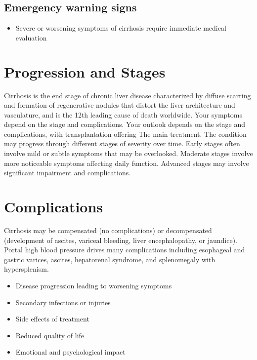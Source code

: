 \subsection{Emergency warning signs}
\begin{itemize}[noitemsep]
  \item Severe or worsening symptoms of cirrhosis require immediate medical evaluation
\end{itemize}
\section{Progression and Stages}
Cirrhosis is the end stage of chronic liver disease characterized by diffuse scarring and formation of regenerative nodules that distort the liver architecture and vasculature, and is the 12th leading cause of death worldwide. Your symptoms depend on the stage and complications. Your outlook depends on the stage and complications, with transplantation offering The main treatment. The condition may progress through different stages of severity over time. Early stages often involve mild or subtle symptoms that may be overlooked. Moderate stages involve more noticeable symptoms affecting daily function. Advanced stages may involve significant impairment and complications.
\section{Complications}
Cirrhosis may be compensated (no complications) or decompensated (development of ascites, variceal bleeding, liver encephalopathy, or jaundice). Portal high blood pressure drives many complications including esophageal and gastric varices, ascites, hepatorenal syndrome, and splenomegaly with hypersplenism.

\begin{itemize}[noitemsep]
  \item Disease progression leading to worsening symptoms
  \item Secondary infections or injuries
  \item Side effects of treatment
  \item Reduced quality of life
  \item Emotional and psychological impact
\end{itemize}
